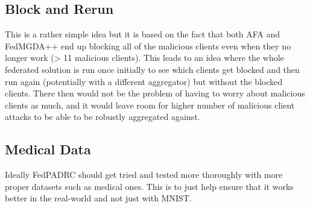 \subsection{Block and Rerun}
This is a rather simple idea but it is based on the fact that both AFA and FedMGDA++ end up blocking all of the malicious clients even when they no longer work (> 11 malicious clients).
This leads to an idea where the whole federated solution is run once initially to see which clients get blocked and then run again (potentially with a different aggregator) but without the blocked clients.
There then would not be the problem of having to worry about malicious clients as much, and it would leave room for higher number of malicious client attacks to be able to be robustly aggregated against.


\subsection{Medical Data}
Ideally FedPADRC should get tried and tested more thoroughly with more proper datasets such as medical ones.
This is to just help ensure that it works better in the real-world and not just with MNIST.
